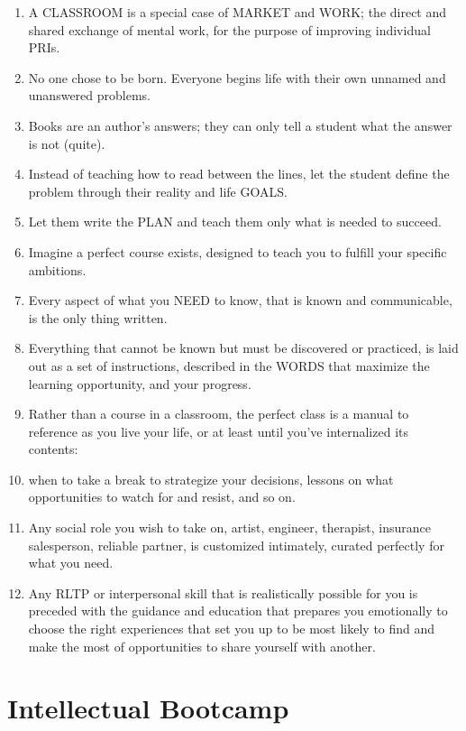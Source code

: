 \documentclass[
]{book}
\begin{document}
\begin{enumerate}
\def\labelenumi{\arabic{enumi}.}
\setcounter{enumi}{37}
\item
  A CLASSROOM is a special case of MARKET and WORK; the direct and shared exchange of mental work, for the purpose of improving individual PRIs.
\item
  No one chose to be born. Everyone begins life with their own unnamed and unanswered problems.
\item
  Books are an author's answers; they can only tell a student what the answer is not (quite).
\item
  Instead of teaching how to read between the lines, let the student define the problem through their reality and life GOALS.
\item
  Let them write the PLAN and teach them only what is needed to succeed.
\item
  Imagine a perfect course exists, designed to teach you to fulfill your specific ambitions.
\item
  Every aspect of what you NEED to know, that is known and
  communicable, is the only thing written.
\item
  Everything that cannot be known but must be discovered or practiced, is laid out as a set of instructions, described in the WORDS that maximize the learning opportunity, and your progress.
\item
  Rather than a course in a classroom, the perfect class is a manual to reference as you live your life, or at least until you've internalized its contents:
\item
  when to take a break to strategize your decisions, lessons on what opportunities to watch for and resist, and so on.
\item
  Any social role you wish to take on, artist, engineer, therapist, insurance salesperson, reliable partner, is customized intimately, curated perfectly for what you need.
\item
  Any RLTP or interpersonal skill that is realistically possible for you is preceded with the guidance and education that prepares you emotionally to choose the right experiences that set you up to be most likely to find and make the most of opportunities to share yourself with another.
\end{enumerate}

\hypertarget{intellectual-bootcamp}{%
\section{Intellectual Bootcamp}\label{intellectual-bootcamp}}
\end{document}
